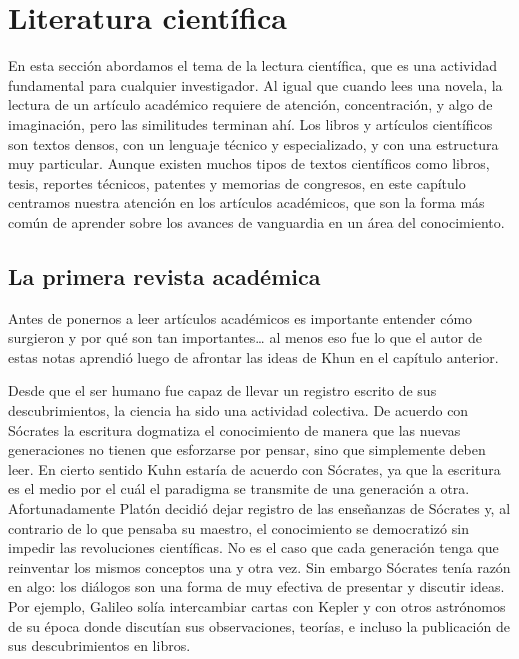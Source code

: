 \chapter{Literatura científica}
\label{cha:literaturacientifica}

En esta sección abordamos el tema de la lectura científica, que es una actividad
fundamental para cualquier investigador.
Al igual que cuando lees una novela, la lectura de un artículo académico
requiere de atención, concentración, y algo de imaginación, pero las similitudes
terminan ahí.
Los libros y artículos científicos son textos densos, con un lenguaje técnico y
especializado, y con una estructura muy particular.
Aunque existen muchos tipos de textos científicos como libros, tesis, reportes
técnicos, patentes y memorias de congresos, en este capítulo centramos nuestra
atención en los artículos académicos, que son la forma más común de aprender
sobre los avances de vanguardia en un área del conocimiento.

\section{La primera revista académica}
\label{sec:contexto}
Antes de ponernos a leer artículos académicos es importante entender cómo
surgieron y por qué son tan importantes… al menos eso fue lo que el autor de
estas notas aprendió luego de afrontar las ideas de Khun en el capítulo
anterior.

Desde que el ser humano fue capaz de llevar un registro escrito de sus
descubrimientos, la ciencia ha sido una actividad colectiva.
De acuerdo con Sócrates la escritura dogmatiza el conocimiento de manera que las
nuevas generaciones no tienen que esforzarse por pensar, sino que simplemente
deben leer.
En cierto sentido Kuhn estaría de acuerdo con Sócrates, ya que la escritura
es el medio por el cuál el paradigma se transmite de una generación a otra.
Afortunadamente Platón decidió dejar registro de las enseñanzas de Sócrates y,
al contrario de lo que pensaba su maestro, el conocimiento se democratizó sin
impedir las revoluciones científicas.
No es el caso que cada generación tenga que reinventar los mismos conceptos una
y otra vez.
Sin embargo Sócrates tenía razón en algo: los diálogos son una forma de
muy efectiva de presentar y discutir ideas.
Por ejemplo, Galileo solía intercambiar cartas con Kepler y con otros astrónomos
de su época donde discutían sus observaciones, teorías, e incluso la publicación
de sus descubrimientos en libros.

